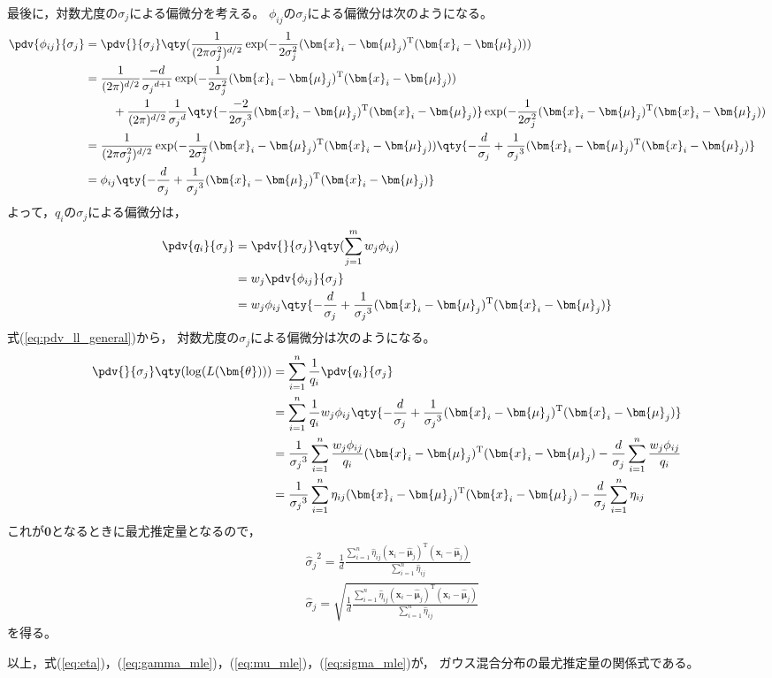 \documentclass[class=jsarticle, crop=false, dvipdfmx, fleqn]{standalone}
\begin{document}
最後に，対数尤度の\(\sigma_j\)による偏微分を考える。
\(\phi_{ij}\)の\(\sigma_j\)による偏微分は次のようになる。
\begin{align}
    \pdv{\phi_{ij}}{\sigma_j}
        & = \pdv{}{\sigma_j} \qty(\frac{1}{(2\pi\sigma_j^2)^{d/2}} \exp(-\frac{1}{2\sigma_j^2} (\bm{x}_i-\bm{\mu}_j)^\mathrm{T}(\bm{x}_i-\bm{\mu}_j))) \\
        & = \frac{1}{(2\pi)^{d/2}} \frac{-d}{{\sigma_j}^{d+1}} \exp(-\frac{1}{2\sigma_j^2} (\bm{x}_i-\bm{\mu}_j)^\mathrm{T}(\bm{x}_i-\bm{\mu}_j)) \\
        & \ \qquad + \frac{1}{(2\pi)^{d/2}} \frac{1}{{\sigma_j}^d} \qty{-\frac{-2}{2 {\sigma_j}^3} (\bm{x}_i-\bm{\mu}_j)^\mathrm{T}(\bm{x}_i-\bm{\mu}_j)} \exp(-\frac{1}{2\sigma_j^2} (\bm{x}_i-\bm{\mu}_j)^\mathrm{T}(\bm{x}_i-\bm{\mu}_j)) \\
        & = \frac{1}{(2\pi\sigma_j^2)^{d/2}} \exp(-\frac{1}{2\sigma_j^2} (\bm{x}_i-\bm{\mu}_j)^\mathrm{T}(\bm{x}_i-\bm{\mu}_j)) \qty{- \frac{d}{\sigma_j} + \frac{1}{{\sigma_j}^3} (\bm{x}_i-\bm{\mu}_j)^\mathrm{T}(\bm{x}_i-\bm{\mu}_j)} \\
        & = \phi_{ij} \qty{- \frac{d}{\sigma_j} + \frac{1}{{\sigma_j}^3} (\bm{x}_i-\bm{\mu}_j)^\mathrm{T}(\bm{x}_i-\bm{\mu}_j)}
\end{align}
よって，\(q_i\)の\(\sigma_j\)による偏微分は，
\begin{align}
    \pdv{q_i}{\sigma_j}
        & = \pdv{}{\sigma_j} \qty(\sum_{j=1}^{m} w_j \phi_{ij}) \\
        & = w_j \pdv{\phi_{ij}}{\sigma_j} \\
        & = w_j \phi_{ij} \qty{- \frac{d}{\sigma_j} + \frac{1}{{\sigma_j}^3} (\bm{x}_i-\bm{\mu}_j)^\mathrm{T}(\bm{x}_i-\bm{\mu}_j)}
\end{align}
式(\ref{eq:pdv_ll_general})から，
対数尤度の\(\sigma_j\)による偏微分は次のようになる。
\begin{align}
    \pdv{}{\sigma_j} \qty(\log(L(\bm{\theta})))
        & = \sum_{i=1}^{n} \frac{1}{q_i} \pdv{q_i}{\sigma_j} \\
        & = \sum_{i=1}^{n} \frac{1}{q_i} w_j \phi_{ij} \qty{- \frac{d}{\sigma_j} + \frac{1}{{\sigma_j}^3} (\bm{x}_i-\bm{\mu}_j)^\mathrm{T}(\bm{x}_i-\bm{\mu}_j)} \\
        & = \frac{1}{{\sigma_j}^3} \sum_{i=1}^{n} \frac{w_j \phi_{ij}}{q_i} (\bm{x}_i-\bm{\mu}_j)^\mathrm{T}(\bm{x}_i-\bm{\mu}_j) - \frac{d}{\sigma_j} \sum_{i=1}^{n} \frac{w_j \phi_{ij}}{q_i} \\
        & = \frac{1}{{\sigma_j}^3} \sum_{i=1}^{n} \eta_{ij} (\bm{x}_i-\bm{\mu}_j)^\mathrm{T}(\bm{x}_i-\bm{\mu}_j) - \frac{d}{\sigma_j} \sum_{i=1}^{n} \eta_{ij}
\end{align}
これが\(\bm{0}\)となるときに最尤推定量となるので，
\begin{align}
    & {\hat{\sigma}_j}^2 = \frac{1}{d} \frac{\sum_{i=1}^{n} \hat{\eta}_{ij} (\bm{x}_i-\hat{\bm{\mu}}_j)^\mathrm{T}(\bm{x}_i-\hat{\bm{\mu}}_j)}{\sum_{i=1}^{n} \hat{\eta}_{ij}} \\
    & \hat{\sigma}_j = \sqrt{\frac{1}{d} \frac{\sum_{i=1}^{n} \hat{\eta}_{ij} (\bm{x}_i-\hat{\bm{\mu}}_j)^\mathrm{T}(\bm{x}_i-\hat{\bm{\mu}}_j)}{\sum_{i=1}^{n} \hat{\eta}_{ij}}}
        \label{eq:sigma_mle}
\end{align}
を得る。

以上，式(\ref{eq:eta})，(\ref{eq:gamma_mle})，(\ref{eq:mu_mle})，(\ref{eq:sigma_mle})が，
ガウス混合分布の最尤推定量の関係式である。
\end{document}
